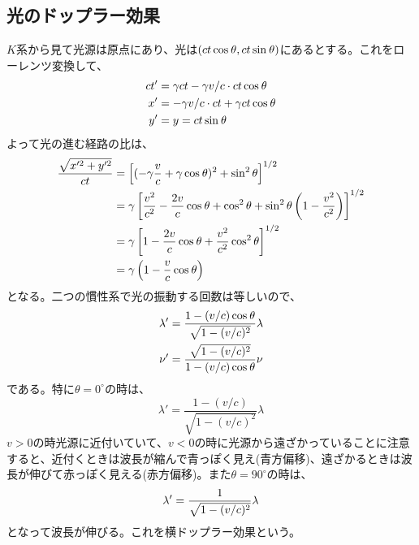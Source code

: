 \documentclass{jsarticle}
\begin{document}
        \subsection{光のドップラー効果}
            $K$系から見て光源は原点にあり、光は$(ct\co,ct\si)$にあるとする。これをローレンツ変換して、
            \begin{align*}
                ct' &= \ga ct-\ga v/c\cdot ct\co\\
                x' &= -\ga v/c\cdot ct+\ga ct\co\\
                y' &= y = ct\si
            \end{align*}
            よって光の進む経路の比は、
            \begin{align*}
                \frac{\sqrt{x'^2+y'^2}}{ct} &= \llr{
                (-\ga\frac{v}{c}+\ga\co)^2+\si[2]}^{1/2}\\
                &= \ga\llr{\frac{v^2}{c^2}-\frac{2v}{c}\co+\co[2]+\si[2]\lr{1-\frac{v^2}{c^2}}}^{1/2}\\
                &= \ga\llr{1-\frac{2v}{c}\co+\frac{v^2}{c^2}\co[2]}^{1/2}\\
                &= \ga\lr{1-\frac{v}{c}\co}
            \end{align*}
            となる。二つの慣性系で光の振動する回数は等しいので、
            \begin{gather*}
                \lambda' = \frac{1-(v/c)\co}{\sqrt{1-(v/c)^2}}\lambda\\
                \nu' = \frac{\sqrt{1-(v/c)^2}}{1-(v/c)\co}\nu
            \end{gather*}
            である。特に$\theta=0^{\circ}$の時は、
                \[\lambda' = \frac{1-(v/c)}{\sqrt{1-(v/c)^2}}\lambda\]
            $v>0$の時光源に近付いていて、$v<0$の時に光源から遠ざかっていることに注意すると、近付くときは波長が縮んで青っぽく見え(青方偏移)、遠ざかるときは波長が伸びて赤っぽく見える(赤方偏移)。また$\theta=90^{\circ}$の時は、
                \[\lambda' = \rec{\sqrt{1-(v/c)^2}}\lambda\]
            となって波長が伸びる。これを横ドップラー効果という。
\end{document}
